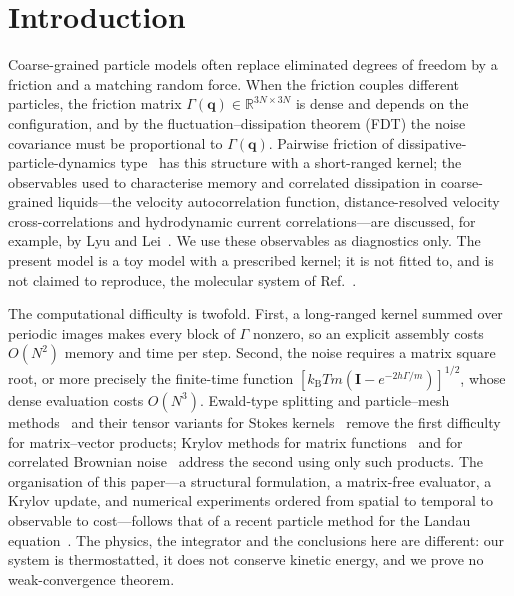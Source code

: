 \documentclass[11pt]{article}
\DeclareRobustCommand{\_}{\textunderscore\allowbreak}
\theoremstyle{remark}
\theoremstyle{definition}
\newcommand{\bq}{\mathbf{q}}
\newcommand{\Id}{\mathbf{I}}
\newcommand{\R}{\mathbb{R}}
\newcommand{\kT}{k_{\mathrm B}T}
\begin{document}
\section{Introduction}\label{sec:intro}

Coarse-grained particle models often replace eliminated degrees of freedom by a friction and a matching random force.
When the friction couples different particles, the friction matrix $\Gamma(\bq)\in\R^{3N\times3N}$ is dense and
depends on the configuration, and by the fluctuation--dissipation theorem (FDT) the noise covariance must be
proportional to $\Gamma(\bq)$. Pairwise friction of dissipative-particle-dynamics type~\cite{EspanolWarren1995} has
this structure with a short-ranged kernel; the observables used to characterise memory and correlated dissipation in
coarse-grained liquids---the velocity autocorrelation function, distance-resolved velocity cross-correlations and
hydrodynamic current correlations---are discussed, for example, by Lyu and Lei~\cite{LyuLei2023}. We use these
observables as diagnostics only. The present model is a toy model with a prescribed kernel; it is not fitted to,
and is not claimed to reproduce, the molecular system of Ref.~\cite{LyuLei2023}.

The computational difficulty is twofold. First, a long-ranged kernel summed over periodic images makes every block
of $\Gamma$ nonzero, so an explicit assembly costs $O(N^2)$ memory and time per step. Second, the noise requires a
matrix square root, or more precisely the finite-time function
$[\kT m(\Id-e^{-2h\Gamma/m})]^{1/2}$, whose dense evaluation costs $O(N^3)$. Ewald-type splitting and particle--mesh
methods~\cite{Ewald1921,HockneyEastwood1988,Darden1993,Essmann1995,DesernoHolm1998} and their tensor variants for
Stokes kernels~\cite{Hasimoto1959,LindboTornberg2010} remove the first difficulty for matrix--vector products;
Krylov methods for matrix functions~\cite{Saad1992,Higham2008} and for correlated Brownian noise~\cite{Ando2012,ChowSaad2014}
address the second using only such products. The organisation of this paper---a structural formulation, a
matrix-free evaluator, a Krylov update, and numerical experiments ordered from spatial to temporal to observable to
cost---follows that of a recent particle method for the Landau equation~\cite{ZhaoDouLei}. The physics, the
integrator and the conclusions here are different: our system is thermostatted, it does not conserve kinetic
energy, and we prove no weak-convergence theorem.
\end{document}

